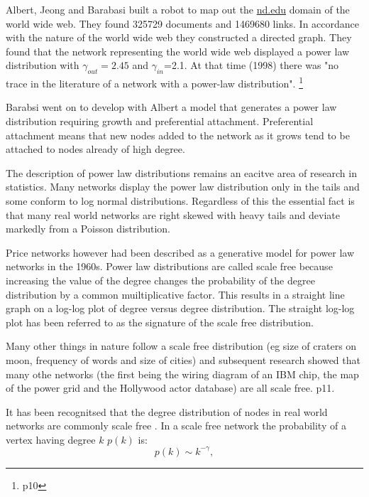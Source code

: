 Albert, Jeong and Barabasi \cite{albert1999diameter} built a robot to map out the \url{nd.edu} domain of the world wide web. They found 325729 documents and 1469680 links. In accordance with the nature of the world wide web they constructed a directed graph. They found that the network representing the world wide web displayed a power law distribution with $\gamma_{out}=2.45$ and $\gamma_{in}$=2.1. At that time (1998) there was "no trace in the literature of a network with a power-law distribution". \cite{barabasi2016network}\footnote{p10}

Barabsi went on to develop with Albert a model that generates a power law distribution requiring growth and preferential attachment. Preferential attachment means that new nodes added to the network as it grows tend to be attached to nodes already of high degree.

The description of power law distributions remains an eacitve area of research in statistics. Many networks display the power law distribution only in the tails and some conform to log normal distributions. Regardless of this the essential fact is that many real world networks are right skewed with heavy tails and deviate markedly from a Poisson distribution. 

Price networks however had been described as a generative model for power law networks in the 1960s. Power law distributions are called scale free because increasing the value of the degree changes the probability of the degree distribution by a common muiltiplicative factor. This results in a straight line graph on a log-log plot of degree versus degree distribution. The straight log-log plot has been referred to as the signature of the scale free distribution. 

Many other things in nature follow a scale free distribution (eg size of craters on moon, frequency of words and size of cities) and subsequent research showed that many othe networks (the first being the wiring diagram of an IBM chip, the map of the power grid and the Hollywood actor database) are all scale free.\cite{barabasi2016network} p11.

It has been recognitsed that the degree distribution of nodes in real world networks are commonly scale free \cite{barabasi1999emergence} \cite{barabasi1999mean}. In a scale free network the probability of a vertex having degree $k$ $p(k)$ is:
\begin{equation}
    p(k) \sim k^{-\gamma},
\end{equation}
\label{eq:scale free}


